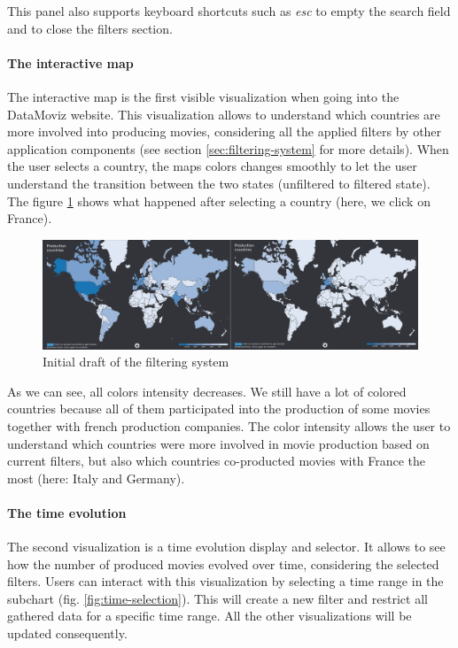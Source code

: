 \documentclass[a4paper,10pt]{article}
\begin{document}
This panel also supports keyboard shortcuts such as \textit{esc} to empty the search
field and to close the filters section.

\paragraph{The interactive map} The interactive map is the first visible visualization
when going into the DataMoviz website. This visualization allows to understand which
countries are more involved into producing movies, considering all the applied filters
by other application components (see section \ref{sec:filtering-system} for more details).
When the user selects a country, the maps colors changes smoothly to let the user understand
the transition between the two states (unfiltered to filtered state). The figure \ref{fig:country-selection}
shows what happened after selecting a country (here, we click on France).

\begin{figure}[ht]
  \centering
  \includegraphics[width=1\linewidth]{images/screens/country-selection.png}
  \caption{Initial draft of the filtering system} \label{fig:country-selection}
\end{figure}

As we can see, all colors intensity decreases. We still have a lot of colored countries
because all of them participated into the production of some movies together with
french production companies. The color intensity allows the user to understand which
countries were more involved in movie production based on current filters, but also
which countries co-producted movies with France the most (here: Italy and Germany).

\paragraph{The time evolution}

The second visualization is a time evolution display and selector. It allows to
see how the number of produced movies evolved over time, considering the selected
filters. Users can interact with this visualization by selecting a time range in the
subchart (fig. \ref{fig:time-selection}). This will create a new filter and restrict all gathered data for a specific
time range. All the other visualizations will be updated consequently.
\end{document}
